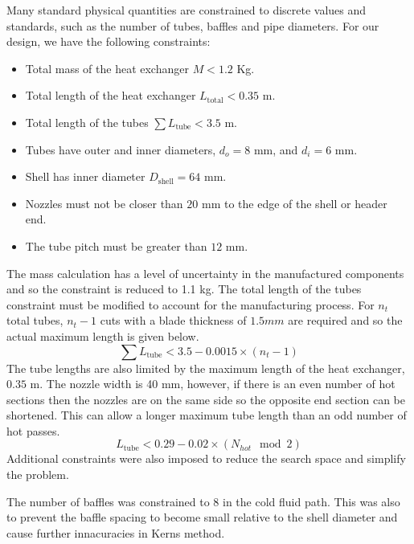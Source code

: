 \documentclass{article}
\begin{document}
Many standard physical quantities are constrained to discrete values and standards, such as the number of tubes, baffles and pipe diameters.
For our design, we have the following constraints:
\begin{itemize}
  \item Total mass of the heat exchanger $M < 1.2$ Kg.
  \item Total length of the heat exchanger $L_{\text{total}} < 0.35$ m.
  \item Total length of the tubes $\sum L_{\text{tube}} < 3.5$ m.
  \item Tubes have outer and inner diameters, $d_{o} = 8$ mm, and $d_{i} = 6$ mm.
  \item Shell has inner diameter $D_{\text{shell}} = 64$ mm.
  \item Nozzles must not be closer than $20$ mm to the edge of the shell or header end.
  \item The tube pitch must be greater than $12$ mm.
\end{itemize}

The mass calculation has a level of uncertainty in the manufactured components and so the constraint is reduced to 1.1 kg.
The total length of the tubes constraint must be modified to account for the manufacturing process.
For $n_t$ total tubes, $n_t - 1$ cuts with a blade thickness of $1.5 mm$ are required and so the actual maximum length is given below.
\vspace{5pt}
\begin{equation}
  \sum L_\text{tube} < 3.5 - 0.0015 \times (n_t - 1)
\end{equation}
\vspace{5pt}
The tube lengths are also limited by the maximum length of the heat exchanger, $0.35$ m.
The nozzle width is 40 mm, however, if there is an even number of hot sections then the nozzles are on the same side so the opposite end section can be shortened.
This can allow a longer maximum tube length than an odd number of hot passes.
\vspace{5pt}
\begin{equation}
  L_\text{tube} < 0.29 - 0.02 \times ( N_{hot}\mod 2)
\end{equation}
\vspace{5pt}
Additional constraints were also imposed to reduce the search space and simplify the problem.

The number of baffles was constrained to 8 in the cold fluid path. %
This was also to prevent the baffle spacing to become small relative to the shell diameter and cause further
innacuracies in Kerns method.
\end{document}
